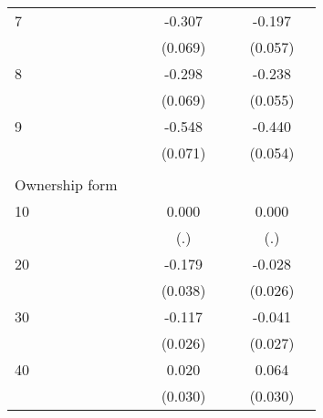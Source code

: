 \begin{longtable}{l*{3}{c}|l*{3}{c}}
	7                   &                     &                     &      -0.307\sym{***}&                     &                     &      -0.197\sym{***}\\
	&                     &                     &     (0.069)         &                     &                     &     (0.057)         \\
	8                   &                     &                     &      -0.298\sym{***}&                     &                     &      -0.238\sym{***}\\
	&                     &                     &     (0.069)         &                     &                     &     (0.055)         \\
	9                   &                     &                     &      -0.548\sym{***}&                     &                     &      -0.440\sym{***}\\
	&                     &                     &     (0.071)         &                     &                     &     (0.054)         \\
	&&&&&&&\\
	Ownership form &&&&&&\\
	10                  &                     &                     &       0.000         &                     &                     &       0.000         \\
	&                     &                     &         (.)         &                     &                     &         (.)         \\
	20                  &                     &                     &      -0.179\sym{***}&                     &                     &      -0.028         \\
	&                     &                     &     (0.038)         &                     &                     &     (0.026)         \\
	30                  &                     &                     &      -0.117\sym{***}&                     &                     &      -0.041         \\
	&                     &                     &     (0.026)         &                     &                     &     (0.027)         \\
	40                  &                     &                     &       0.020         &                     &                     &       0.064\sym{**} \\
	&                     &                     &     (0.030)         &                     &                     &     (0.030)         \\

\end{longtable}
